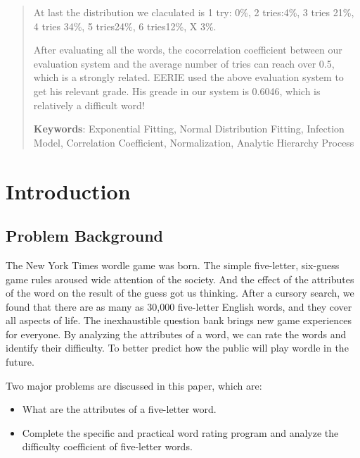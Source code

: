 \documentclass[12pt]{article}  %
\begin{document}
\begin{abstract}
At last the distribution we claculated is 1 try: 0\%, 2 tries:4\%, 3 tries 21\%, 4 tries 34\%, 5 tries24\%, 6 tries12\%, X 3\%.


After evaluating all the words, the cocorrelation coefficient between our evaluation system and the average number of tries can reach over 0.5, which is a strongly related. EERIE used the above evaluation system to get his relevant grade. His greade in our system is 0.6046, which is relatively a difficult word!




     \vspace{5pt}
     \textbf{Keywords}: Exponential Fitting, Normal Distribution Fitting, Infection Model, Correlation Coefficient, Normalization, Analytic Hierarchy Process 

\end{abstract}

\maketitle  %
\tableofcontents  %


\section{Introduction}
\subsection{Problem Background}
The New York Times wordle game was born. The simple five-letter, six-guess game rules aroused wide attention of the society. And the effect of the attributes of the word on the result of the guess got us thinking. After a cursory search, we found that there are as many as 30,000 five-letter English words, and they cover all aspects of life. The inexhaustible question bank brings new game experiences for everyone. By analyzing the attributes of a word, we can rate the words and identify their difficulty. To better predict how the public will play wordle in the future.


Two major problems are discussed in this paper, which are:
\begin{itemize}
     \item What are the attributes of a five-letter word.
    \item Complete the specific and practical word rating program and analyze the difficulty coefficient of five-letter words.
\end{itemize}
\end{document}
